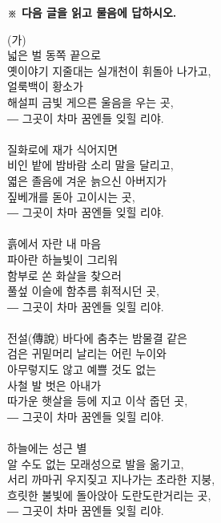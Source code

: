 \documentclass[11pt,a4paper]{article}
\begin{document}
\vspace{4mm}
{\small\textbf{※ 다음 글을 읽고 물음에 답하시오.}}
\vspace{2mm}
\begin{tcolorbox}[passage]
(가) \\{}
넓은 벌 동쪽 끝으로 \\{}
옛이야기 지줄대는 실개천이 휘돌아 나가고, \\{}
얼룩백이 황소가 \\{}
해설피 금빛 게으른 울음을 우는 곳, \\{}
― 그곳이 차마 꿈엔들 잊힐 리야. \\{}
\vspace{4pt} \\{}
질화로에 재가 식어지면 \\{}
비인 밭에 밤바람 소리 말을 달리고, \\{}
엷은 졸음에 겨운 늙으신 아버지가 \\{}
짚베개를 돋아 고이시는 곳, \\{}
― 그곳이 차마 꿈엔들 잊힐 리야. \\{}
\vspace{4pt} \\{}
흙에서 자란 내 마음 \\{}
파아란 하늘빛이 그리워 \\{}
함부로 쏜 화살을 찾으러 \\{}
풀섶 이슬에 함추름 휘적시던 곳, \\{}
― 그곳이 차마 꿈엔들 잊힐 리야. \\{}
\vspace{4pt} \\{}
전설(傳說) 바다에 춤추는 밤물결 같은 \\{}
검은 귀밑머리 날리는 어린 누이와 \\{}
아무렇지도 않고 예쁠 것도 없는 \\{}
사철 발 벗은 아내가 \\{}
따가운 햇살을 등에 지고 이삭 줍던 곳, \\{}
― 그곳이 차마 꿈엔들 잊힐 리야. \\{}
\vspace{4pt} \\{}
하늘에는 성근 별 \\{}
알 수도 없는 모래성으로 발을 옮기고, \\{}
서리 까마귀 우지짖고 지나가는 초라한 지붕, \\{}
흐릿한 불빛에 돌아앉아 도란도란거리는 곳, \\{}
― 그곳이 차마 꿈엔들 잊힐 리야. \\{}

\end{tcolorbox}
\end{document}
